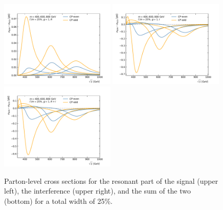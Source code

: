 \begin{figure}
  \centering
  \includegraphics[width=0.49\textwidth]{fig/chapt4/gen_plots/analytical/xSec_relW25_R}
  \includegraphics[width=0.49\textwidth]{fig/chapt4/gen_plots/analytical/xSec_relW25_I} \\
  \includegraphics[width=0.49\textwidth]{fig/chapt4/gen_plots/analytical/xSec_relW25_Sum}
  \caption{Parton-level cross sections for the resonant part of the signal (upper left), the interference (upper right), and the sum of the two (bottom) for a total width of 25\%.}
  \label{Fig:AnalyticXSec_relW25}
\end{figure}



\clearpage{\pagestyle{empty}\cleardoublepage}
\renewcommand*{\thesection}{\thechapter.\arabic{section}}       %